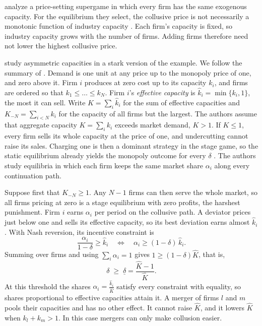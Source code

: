 \citet{BrockScheinkman1985} analyze a price-setting supergame in which every firm has the same exogenous capacity.
For the equilibrium they select, the collusive price is not necessarily a monotonic function of industry capacity
\citep[ch.~6, note~10]{Tirole1988}. Each firm's capacity is fixed, so industry capacity grows with the number of
firms. Adding firms therefore need not lower the highest collusive price.

\citet{CompteJennyRey2002} study asymmetric capacities in a stark version of the example. We follow the summary of
\citet[pp.~239--240]{AskerNocke2021}. Demand is one unit at any price up to the monopoly price of one, and zero
above it. Firm $i$ produces at zero cost up to its capacity $k_i$, and firms are ordered so that
$k_1 \le \dots \le k_N$. Firm $i$'s \emph{effective capacity} is $\hat k_i = \min\{k_i, 1\}$, the most it can sell.
Write $\hat K = \sum_i \hat k_i$ for the sum of effective capacities and $K_{-N} = \sum_{i < N}k_i$ for the capacity
of all firms but the largest. The authors assume that aggregate capacity $K = \sum_i k_i$ exceeds market demand, $K > 1$.
If $K \le 1$, every firm sells its whole capacity at the price of one, and undercutting cannot raise its sales.
Charging one is then a dominant strategy in the stage game, so the static equilibrium already yields the monopoly
outcome for every $\delta$ \citep[Section 2]{CompteJennyRey2002}. The authors study equilibria in which each firm keeps the same market share $\alpha_i$
along every continuation path.

Suppose first that $K_{-N} \ge 1$. Any $N - 1$ firms can then serve the whole market, so all firms pricing at zero is
a stage equilibrium with zero profits, the harshest punishment. Firm $i$ earns $\alpha_i$ per period on the collusive
path. A deviator prices just below one and sells its effective capacity, so its best deviation earns almost
$\hat k_i$. With Nash reversion, its incentive constraint is
\begin{equation*}
\frac{\alpha_i}{1 - \delta} \ge \hat k_i
\quad\Longleftrightarrow\quad
\alpha_i \ge (1 - \delta)\,\hat k_i .
\end{equation*}
Summing over firms and using $\sum_i \alpha_i = 1$ gives $1 \ge (1 - \delta)\hat K$, that is,
\begin{equation}\label{eq:12-cjr}
\delta \;\ge\; \underline\delta = \frac{\hat K - 1}{\hat K} .
\end{equation}
At this threshold the shares $\alpha_i = \frac{\hat k_i}{\hat K}$ satisfy every constraint with equality, so shares
proportional to effective capacities attain it. A merger of firms $l$ and $m$ pools their capacities and has no
other effect. It cannot raise $\hat K$, and it lowers $\hat K$ when $k_l + k_m > 1$. In this case mergers can only
make collusion easier.

